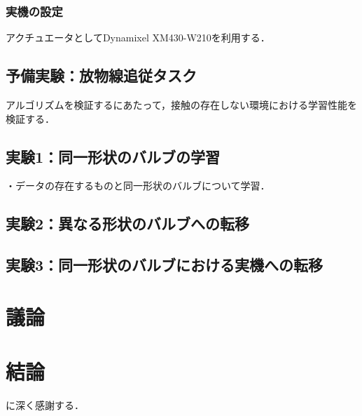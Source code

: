 \documentclass[dvipdfmx]{ampbt_nomag}
\def\numberofspines{1}
\begin{document}
\subsubsection{実機の設定}
アクチュエータとしてDynamixel XM430-W210を利用する．



\subsection{予備実験：放物線追従タスク}
アルゴリズムを検証するにあたって，接触の存在しない環境における学習性能を検証する．

\subsection{実験1：同一形状のバルブの学習}
・データの存在するものと同一形状のバルブについて学習．
\subsection{実験2：異なる形状のバルブへの転移}
\subsection{実験3：同一形状のバルブにおける実機への転移}


\section{議論}\label{sec-discussion}

\section{結論}\label{sec-conclusion}



\acknowledgment
に深く感謝する．




\appendix


\fi
\ifoutputcover
\cleardoublepage
\makecover                      %
\makespine[\numberofspines]     %
\fi
\ifoutputabstractforsubmission
\makeabstractforsubmission      %
\fi
\end{document}
